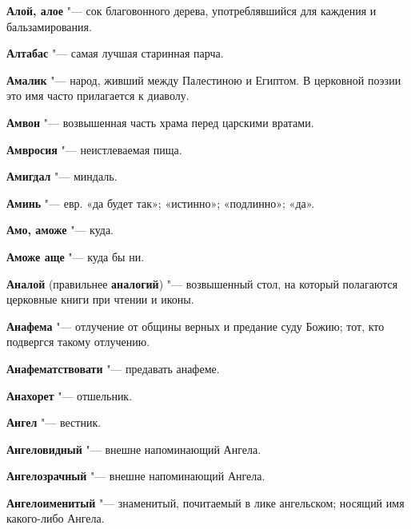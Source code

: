 \begin{mymulticols}{2}
\noindent\textbf{Алой, алое} "--- сок благовонного дерева, употреблявшийся для каждения и бальзамирования. 




\noindent\textbf{Алтабас} "--- самая лучшая старинная парча. 




\noindent\textbf{Амалик} "--- народ, живший между Палестиною и Египтом. В церковной поэзии это имя часто прилагается к диаволу. 




\noindent\textbf{Амвон} "--- возвышенная часть храма перед царскими вратами. 




\noindent\textbf{Амвросия} "--- неистлеваемая пища. 




\noindent\textbf{Амигдал} "--- миндаль. 




\noindent\textbf{Аминь} "--- евр. «да будет так»; «истинно»; «подлинно»; «да». 




\noindent\textbf{Амо, аможе} "--- куда. 




\noindent\textbf{Аможе аще} "--- куда бы ни. 




\noindent\textbf{Аналой} (правильнее \noindent\textbf{аналогий}) "--- возвышенный стол, на который полагаются церковные книги при чтении и иконы. 




\noindent\textbf{Анафема} "--- отлучение от общины верных и предание суду Божию; тот, кто подвергся такому отлучению. 




\noindent\textbf{Анафематствовати} "--- предавать анафеме. 




\noindent\textbf{Анахорет} "--- отшельник. 




\noindent\textbf{Ангел} "--- вестник. 




\noindent\textbf{Ангеловидный} "--- внешне напоминающий Ангела. 




\noindent\textbf{Ангелозрачный} "--- внешне напоминающий Ангела. 




\noindent\textbf{Ангелоименитый} "--- знаменитый, почитаемый в лике ангельском; носящий имя какого-либо Ангела. 





\end{mymulticols}
